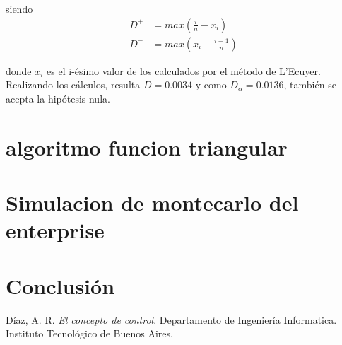 \documentclass[10pt,journal,compsoc]{IEEEtran}
\begin{document}
siendo
\begin{align}
 D^{+} &= max(\frac{i}{n}-x_i)\\
 D^{-} &= max(x_i - \frac{i-1}{n})
\end{align}

donde $x_i$ es el i-\'esimo valor de los calculados por el m\'etodo de L'Ecuyer.
Realizando los c\'alculos, resulta $D = 0.0034$ y como $D_{\alpha} = 0.0136$,
tambi\'en se acepta la hip\'otesis nula.

\section{}

\section{algoritmo funcion triangular}

\section{Simulacion de montecarlo del enterprise}



%

\section{Conclusi\'on}

\begin{thebibliography}{1}

D\'iaz, A. R. \emph{El concepto de control}. Departamento de Ingenier\'ia Informatica. 
Instituto Tecnol\'ogico de Buenos Aires.
\end{thebibliography}
\end{document}
